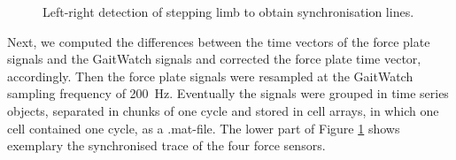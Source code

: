\begin{figure}
	\centering
	\caption{Left-right detection of stepping limb to obtain synchronisation lines.}
	\label{fig:left_right_detect}
\end{figure}

  Next, we computed the differences between the time vectors of the force plate signals and the GaitWatch signals and corrected the force plate time vector, accordingly. Then the force plate signals were resampled at the GaitWatch sampling frequency of \mbox{200 Hz}. Eventually the signals were grouped in time series objects, separated in chunks of one cycle and stored in cell arrays, in which one cell contained one cycle, as a .mat-file. The lower part of Figure \ref{fig:left_right_detect} shows exemplary the synchronised trace of the four force sensors.
 

